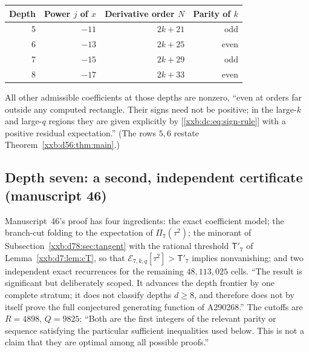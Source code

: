 \documentclass[11pt,a4paper]{article}
\numberwithin{equation}{section}
\theoremstyle{definition}
\theoremstyle{remark}
\theoremstyle{plain}
\begin{document}
\begin{center}
\begin{tabular}{@{}rrrr@{}}
\toprule
Depth & Power $j$ of $x$ & Derivative order $N$ & Parity of $k$\\
\midrule
5 & $-11$ & $2k+21$ & odd\\
6 & $-13$ & $2k+25$ & even\\
7 & $-15$ & $2k+29$ & odd\\
8 & $-17$ & $2k+33$ & even\\
\bottomrule
\end{tabular}
\end{center}
All other admissible coefficients at those depths are nonzero, ``even at
orders far outside any computed rectangle. Their signs need not be positive;
in the large-$k$ and large-$q$ regions they are given explicitly by
[\eqref{xxb:dc:eq:sign-rule}] with a positive residual expectation.''  (The
rows $5,6$ restate Theorem~\ref{xxb:d56:thm:main}.)

\subsection{Depth seven: a second, independent certificate (manuscript 46)}\label{xxb:d7:sec:certificate}

Manuscript~46's proof has four ingredients: the exact coefficient model; the
branch-cut folding to the expectation of $\Pi_7(\tau^2)$; the minorant of
Subsection~\ref{xxb:d78:sec:tangent} with the rational threshold
$\mathsf T'_7$ of Lemma~\ref{xxb:d7:lem:cT}, so that
$\mathcal E_{7,k,q}[\tau^2]>\mathsf T'_7$ implies nonvanishing; and two
independent exact recurrences for the remaining $48{,}113{,}025$ cells.  ``The
result is significant but deliberately scoped.  It advances the depth frontier
by one complete stratum; it does not classify depths $d\geq8$, and therefore
does not by itself prove the full conjectured generating function of
A290268.''  The cutoffs are $R=4898$, $Q=9825$: ``Both are the first integers
of the relevant parity or sequence satisfying the particular sufficient
inequalities used below.  This is not a claim that they are optimal among all
possible proofs.''
\end{document}
